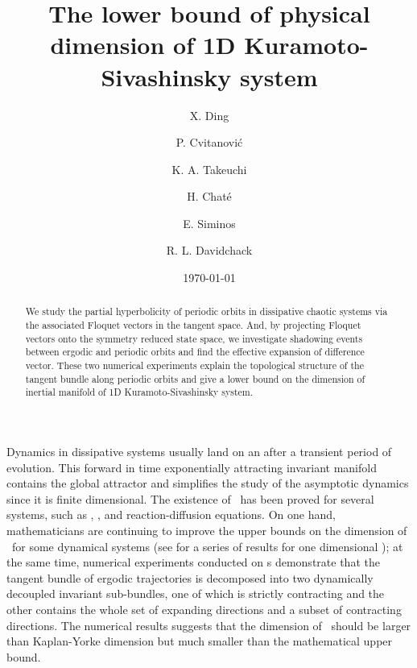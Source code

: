 \documentclass[prl,aps,preprint,showpacs]{revtex4-1} %
\begin{document}
\title{The lower bound of physical dimension
  of 1D Kuramoto-Sivashinsky system}

\author{X. Ding}
\author{P. Cvitanovi\'c}
\author{K. A. Takeuchi}
\author{H. Chat\'e}
\author{E. Siminos}
\author{R. L. Davidchack}


\date{\today}

\begin{abstract}
  We study the partial hyperbolicity of periodic orbits in
  dissipative chaotic systems via the associated Floquet vectors in
  the tangent space. And, by projecting Floquet vectors onto the
  symmetry reduced state space, we investigate shadowing events
  between ergodic and periodic orbits and find the effective
  expansion of difference vector. These two numerical experiments explain the
  topological structure of the tangent bundle along periodic orbits
  and give a lower bound on the dimension of inertial manifold
  of 1D Kuramoto-Sivashinsky system.
\end{abstract}


\pacs{}

\maketitle


Dynamics in dissipative systems usually land on an
\inm{}
after a
transient period of evolution. This forward in time exponentially attracting
invariant manifold contains the global attractor and
simplifies the study of the asymptotic dynamics since it is finite
dimensional. The existence of \inm\ has been proved for several
systems, such as \KSe, \cGLe, and reaction-diffusion equations.
On one hand, mathematicians are continuing to improve the
upper bounds on the dimension of \inm\ for some dynamical systems
(see 
for a series of results for one dimensional
\KSe);
at the same time,  numerical experiments conducted on
\cLv s
demonstrate that the tangent bundle of ergodic trajectories
is decomposed into two dynamically decoupled invariant sub-bundles, one
of which is strictly contracting and the other contains the whole
set of expanding directions and a subset of contracting directions. The
numerical results suggests that the dimension of \inm\
should be larger than Kaplan-Yorke dimension but much smaller than the
mathematical upper bound.
\end{document}
